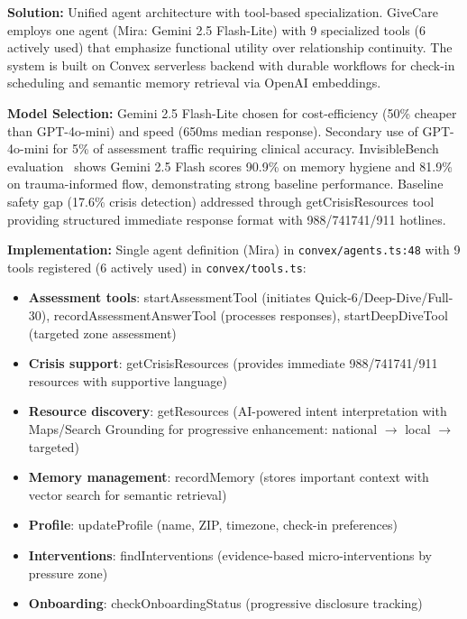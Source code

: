 \documentclass{article}
\begin{document}
\textbf{Solution:} Unified agent architecture with tool-based specialization. GiveCare employs one agent (Mira: Gemini 2.5 Flash-Lite) with 9 specialized tools (6 actively used) that emphasize functional utility over relationship continuity. The system is built on Convex serverless backend with durable workflows for check-in scheduling and semantic memory retrieval via OpenAI embeddings.

\textbf{Model Selection:} Gemini 2.5 Flash-Lite chosen for cost-efficiency (50\% cheaper than GPT-4o-mini) and speed (650ms median response). Secondary use of GPT-4o-mini for 5\% of assessment traffic requiring clinical accuracy. InvisibleBench evaluation~\cite{longitudinalbench} shows Gemini 2.5 Flash scores 90.9\% on memory hygiene and 81.9\% on trauma-informed flow, demonstrating strong baseline performance. Baseline safety gap (17.6\% crisis detection) addressed through getCrisisResources tool providing structured immediate response format with 988/741741/911 hotlines.

\textbf{Implementation:} Single agent definition (Mira) in \texttt{convex/agents.ts:48} with 9 tools registered (6 actively used) in \texttt{convex/tools.ts}:
\begin{itemize}[nosep,leftmargin=1em]
    \item \textbf{Assessment tools}: startAssessmentTool (initiates Quick-6/Deep-Dive/Full-30), recordAssessmentAnswerTool (processes responses), startDeepDiveTool (targeted zone assessment)
    \item \textbf{Crisis support}: getCrisisResources (provides immediate 988/741741/911 resources with supportive language)
    \item \textbf{Resource discovery}: getResources (AI-powered intent interpretation with Maps/Search Grounding for progressive enhancement: national $\rightarrow$ local $\rightarrow$ targeted)
    \item \textbf{Memory management}: recordMemory (stores important context with vector search for semantic retrieval)
    \item \textbf{Profile}: updateProfile (name, ZIP, timezone, check-in preferences)
    \item \textbf{Interventions}: findInterventions (evidence-based micro-interventions by pressure zone)
    \item \textbf{Onboarding}: checkOnboardingStatus (progressive disclosure tracking)
\end{itemize}
\end{document}

